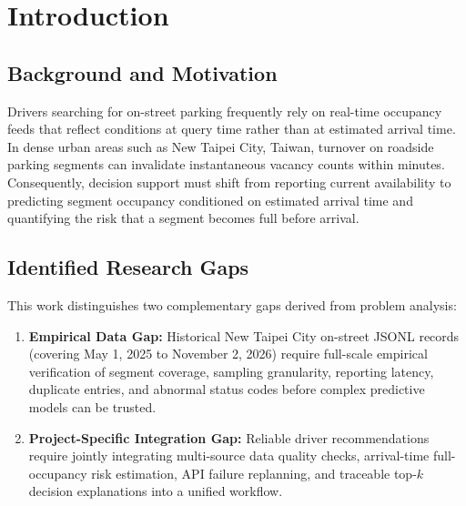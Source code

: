 \documentclass[conference,a4paper]{IEEEtran}
\begin{document}
\section{Introduction}

\subsection{Background and Motivation}
Drivers searching for on-street parking frequently rely on real-time occupancy feeds that reflect conditions at query time rather than at estimated arrival time. In dense urban areas such as New Taipei City, Taiwan, turnover on roadside parking segments can invalidate instantaneous vacancy counts within minutes. Consequently, decision support must shift from reporting current availability to predicting segment occupancy conditioned on estimated arrival time and quantifying the risk that a segment becomes full before arrival.

\subsection{Identified Research Gaps}
This work distinguishes two complementary gaps derived from problem analysis:
\begin{enumerate}
    \item \textbf{Empirical Data Gap:} Historical New Taipei City on-street JSONL records (covering May 1, 2025 to November 2, 2026) require full-scale empirical verification of segment coverage, sampling granularity, reporting latency, duplicate entries, and abnormal status codes before complex predictive models can be trusted.
    \item \textbf{Project-Specific Integration Gap:} Reliable driver recommendations require jointly integrating multi-source data quality checks, arrival-time full-occupancy risk estimation, API failure replanning, and traceable top-$k$ decision explanations into a unified workflow.
\end{enumerate}
\end{document}
